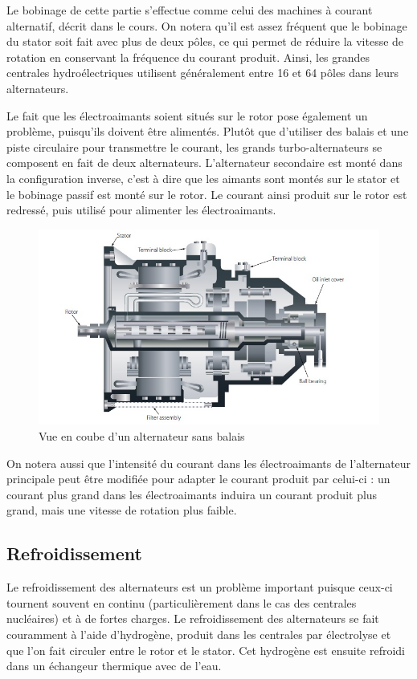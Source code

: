 \documentclass[12pt,a4paper,oneside,openany]{memoir}
\begin{document}
Le bobinage de cette partie s'effectue comme celui des machines à courant alternatif, décrit dans le cours. On notera qu'il est assez fréquent que le bobinage du stator soit fait avec plus de deux pôles, ce qui permet de réduire la vitesse de rotation en conservant la fréquence du courant produit. Ainsi, les grandes centrales hydroélectriques utilisent généralement entre 16 et 64 pôles dans leurs alternateurs.

Le fait que les électroaimants soient situés sur le rotor pose également un problème, puisqu'ils doivent être alimentés. Plutôt que d'utiliser des balais et une piste circulaire pour transmettre le courant, les grands turbo-alternateurs se composent en fait de deux alternateurs. L'alternateur secondaire est monté dans la configuration inverse, c'est à dire que les aimants sont montés sur le stator et le bobinage passif est monté sur le rotor. Le courant ainsi produit sur le rotor est redressé, puis utilisé pour alimenter les électroaimants.

\begin{figure}
\centering
\includegraphics[width=0.9\linewidth]{img/brushless.jpg}
\caption{Vue en coube d'un alternateur sans balais}
\label{fig:brushless}
\end{figure}


On notera aussi que l'intensité du courant dans les électroaimants de l'alternateur principale peut être modifiée pour adapter le courant produit par celui-ci : un courant plus grand dans les électroaimants induira un courant produit plus grand, mais une vitesse de rotation plus faible.


\subsection{Refroidissement}
Le refroidissement des alternateurs est un problème important puisque ceux-ci tournent souvent en continu (particulièrement dans le cas des centrales nucléaires) et à de fortes charges. Le refroidissement des alternateurs se fait couramment à l'aide d'hydrogène, produit dans les centrales par électrolyse et que l'on fait circuler entre le rotor et le stator. Cet hydrogène est ensuite refroidi dans un échangeur thermique avec de l'eau.
\end{document}
